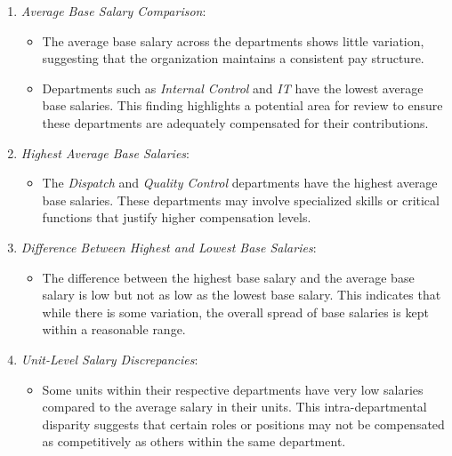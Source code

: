 \documentclass[
]{article}
\providecommand{\tightlist}{%
  \setlength{\itemsep}{0pt}\setlength{\parskip}{0pt}}
\begin{document}
\begin{enumerate}
\def\labelenumi{\arabic{enumi}.}
\tightlist
\item
  \emph{Average Base Salary Comparison}:

  \begin{itemize}
  \tightlist
  \item
    The average base salary across the departments shows little
    variation, suggesting that the organization maintains a consistent
    pay structure.
  \item
    Departments such as \emph{Internal Control} and \emph{IT} have the
    lowest average base salaries. This finding highlights a potential
    area for review to ensure these departments are adequately
    compensated for their contributions.
  \end{itemize}
\item
  \emph{Highest Average Base Salaries}:

  \begin{itemize}
  \tightlist
  \item
    The \emph{Dispatch} and \emph{Quality Control} departments have the
    highest average base salaries. These departments may involve
    specialized skills or critical functions that justify higher
    compensation levels.
  \end{itemize}
\item
  \emph{Difference Between Highest and Lowest Base Salaries}:

  \begin{itemize}
  \tightlist
  \item
    The difference between the highest base salary and the average base
    salary is low but not as low as the lowest base salary. This
    indicates that while there is some variation, the overall spread of
    base salaries is kept within a reasonable range.
  \end{itemize}
\item
  \emph{Unit-Level Salary Discrepancies}:

  \begin{itemize}
  \tightlist
  \item
    Some units within their respective departments have very low
    salaries compared to the average salary in their units. This
    intra-departmental disparity suggests that certain roles or
    positions may not be compensated as competitively as others within
    the same department.
  \end{itemize}
\end{enumerate}
\end{document}
